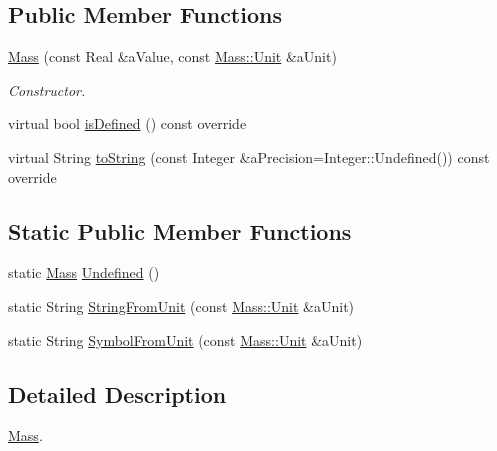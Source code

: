\subsection*{Public Member Functions}
\begin{DoxyCompactItemize}
\item 
\hyperlink{classlibrary_1_1physics_1_1units_1_1_mass_a079df004a90cfe6cfa5c00ce0d816122}{Mass} (const Real \&a\+Value, const \hyperlink{classlibrary_1_1physics_1_1units_1_1_mass_a95f1e0434bc16794926b8e273bc2a54b}{Mass\+::\+Unit} \&a\+Unit)
\begin{DoxyCompactList}\small\item\em Constructor. \end{DoxyCompactList}\item 
virtual bool \hyperlink{classlibrary_1_1physics_1_1units_1_1_mass_a0efde6eb08d6b79baa84229746776b6a}{is\+Defined} () const override
\item 
virtual String \hyperlink{classlibrary_1_1physics_1_1units_1_1_mass_a6e7757920752ac9f6918525d6fadb31e}{to\+String} (const Integer \&a\+Precision=Integer\+::\+Undefined()) const override
\end{DoxyCompactItemize}
\subsection*{Static Public Member Functions}
\begin{DoxyCompactItemize}
\item 
static \hyperlink{classlibrary_1_1physics_1_1units_1_1_mass}{Mass} \hyperlink{classlibrary_1_1physics_1_1units_1_1_mass_af3acc8762e8791a218e877595e94090b}{Undefined} ()
\item 
static String \hyperlink{classlibrary_1_1physics_1_1units_1_1_mass_ab2abb07bd20ab0a435b49b494f4ceb3f}{String\+From\+Unit} (const \hyperlink{classlibrary_1_1physics_1_1units_1_1_mass_a95f1e0434bc16794926b8e273bc2a54b}{Mass\+::\+Unit} \&a\+Unit)
\item 
static String \hyperlink{classlibrary_1_1physics_1_1units_1_1_mass_ad61ae35ac949926191b2517e674467a3}{Symbol\+From\+Unit} (const \hyperlink{classlibrary_1_1physics_1_1units_1_1_mass_a95f1e0434bc16794926b8e273bc2a54b}{Mass\+::\+Unit} \&a\+Unit)
\end{DoxyCompactItemize}


\subsection{Detailed Description}
\hyperlink{classlibrary_1_1physics_1_1units_1_1_mass}{Mass}. 


